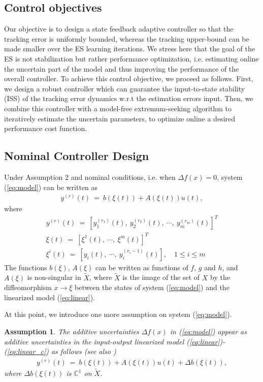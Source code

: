 \documentclass[twoside,leqno,onecolumn]{article}
\newtheorem{assumption}{Assumption}
\begin{document}
\subsection{Control objectives}
Our objective is to design a state feedback adaptive controller so
that the tracking error is uniformly bounded, whereas the tracking
upper-bound can be made smaller over the ES learning iterations.
We stress here that the goal of the ES is not stabilization but
rather performance optimization, i.e. estimating online the
uncertain part of the model and thus improving the performance of
the overall controller. To achieve this control objective, we
proceed as follows. First, we design a robust controller which can
guarantee the input-to-state stability (ISS) of the tracking error
dynamics w.r.t the estimation errors input. Then, we combine this
controller with a model-free extremum-seeking algorithm to
iteratively estimate the uncertain parameters, to optimize online
a desired performance cost function. \subsection{Nominal
Controller Design} \label{sec:norm}
Under Assumption 2 and nominal conditions, i.e. when $\Delta f(x)
= 0$, system (\ref{eq:model}) can be written as
\begin{align}
\label{eq:linear}
y^{(r)}(t) ~=~ b(\xi(t)) + A (\xi(t)) u(t),
\end{align}
where
\begin{equation}
\begin{array}{l}
\displaystyle y^{(r)}(t) ~=~ [y^{(r_1)}_{1}(t), ~y^{(r_2)}_{2}(t),~\cdots,~ y^{(r_m)}_{m}(t)]^T\\
\displaystyle \xi(t) ~=~ [\xi^1(t),~\cdots,~\xi^m(t)]^T\\
\displaystyle \xi ^i(t) ~=~[y_i(t),~\cdots,~y_i^{(r_i-1)}(t)], \quad 1\leq i\leq m
\end{array}
\label{eq:linear_c}
\end{equation}
The functions $b(\xi)$, $A(\xi)$ can be written as functions of
$f$, $g$ and $h$, and $A(\xi)$ is non-singular in $\tilde{X}$,
where $\tilde X$ is the image of the set of $X$ by the
diffeomorphism $x\rightarrow\xi$ between the states of system
(\ref{eq:model}) and the linearized model (\ref{eq:linear}).

At this point, we introduce one more assumption on system (\ref{eq:model}).

\begin{assumption}
The additive uncertainties $\Delta f(x)$ in (\ref{eq:model})
appear as additive uncertainties in the input-output linearized
model (\ref{eq:linear})-(\ref{eq:linear_c}) as follows (see also
\cite{Beno09})
\begin{align}
\label{eq:model_un} y^{(r)}(t) ~=~ b(\xi(t)) + A (\xi(t)) u(t) +
\Delta b(\xi(t)),
\end{align}
where $\Delta b(\xi(t))$ is $\mathbb{C}^1$ on $\tilde X$.
\end{assumption}
\end{document}
